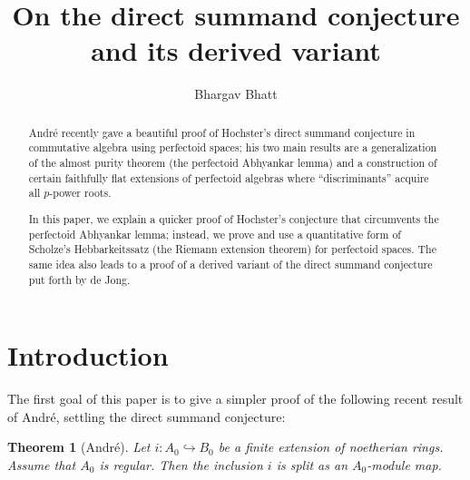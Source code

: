 \documentclass[10pt,reqno]{amsart}
\begin{document}
 \usepackage{./extract}
\newtheorem{theorem}{Theorem}[section]
\newtheorem*{theorem*}{Theorem}
\newtheorem*{definition*}{Definition}
\newtheorem{proposition}[theorem]{Proposition}
\newtheorem{lemma}[theorem]{Lemma}
\newtheorem{corollary}[theorem]{Corollary}

\theoremstyle{definition}
\newtheorem{definition}[theorem]{Definition}
\newtheorem{question}[theorem]{Question}
\newtheorem{remark}[theorem]{Remark}
\newtheorem{warning}[theorem]{Warning}
\newtheorem{example}[theorem]{Example}
\newtheorem{notation}[theorem]{Notation}
\newtheorem{convention}[theorem]{Convention}
\newtheorem{assumption}[theorem]{Assumption}
\newtheorem{construction}[theorem]{Construction}
\newtheorem{claim}[theorem]{Claim}



\title{On the direct summand conjecture and its derived variant}
\author{Bhargav Bhatt}
\address{Department of Mathematics \\ University of Michigan, Ann Arbor}
\begin{abstract}
Andr\'e recently gave a beautiful proof of Hochster's direct summand conjecture in commutative algebra using perfectoid spaces; his two main results are a generalization of the almost purity theorem (the perfectoid Abhyankar lemma) and a construction of certain faithfully flat extensions of perfectoid algebras where ``discriminants'' acquire all $p$-power roots. 

In this paper, we explain a quicker proof of Hochster's conjecture that circumvents the perfectoid Abhyankar lemma; instead, we prove and use a quantitative form of Scholze's Hebbarkeitssatz (the Riemann extension theorem) for perfectoid spaces. The same idea also leads to a proof of a derived variant of the direct summand conjecture put forth by de Jong. 
\end{abstract}
\maketitle


\section{Introduction}

The first goal of this paper is to give a simpler proof of the following recent result of Andr\'e, settling the direct summand conjecture:

\begin{theorem}[Andr\'e]
\label{thm:DSCIntro}
Let $i:A_0 \hookrightarrow B_0$ be a finite extension of noetherian rings. Assume that $A_0$ is regular. Then the inclusion $i$ is split as an $A_0$-module map.
\end{theorem}
\end{document}
